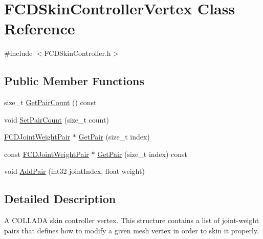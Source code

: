 \hypertarget{classFCDSkinControllerVertex}{
\section{FCDSkinControllerVertex Class Reference}
\label{classFCDSkinControllerVertex}
}


{\ttfamily \#include $<$FCDSkinController.h$>$}

\subsection*{Public Member Functions}
\begin{DoxyCompactItemize}
\item 
size\_\-t \hyperlink{classFCDSkinControllerVertex_a698817cdf93a642d47b4f9428516a025}{GetPairCount} () const 
\item 
void \hyperlink{classFCDSkinControllerVertex_a3dcfd3c7cd7f0694295d87d0c8478c9c}{SetPairCount} (size\_\-t count)
\item 
\hyperlink{structFCDJointWeightPair}{FCDJointWeightPair} $\ast$ \hyperlink{classFCDSkinControllerVertex_a344bac52a2519a2ab482836994c412d5}{GetPair} (size\_\-t index)
\item 
const \hyperlink{structFCDJointWeightPair}{FCDJointWeightPair} $\ast$ \hyperlink{classFCDSkinControllerVertex_a55fd0bfcc9015a5c81249ba18b574834}{GetPair} (size\_\-t index) const 
\item 
void \hyperlink{classFCDSkinControllerVertex_a57770871bd7a86c7959144463228b927}{AddPair} (int32 jointIndex, float weight)
\end{DoxyCompactItemize}


\subsection{Detailed Description}
A COLLADA skin controller vertex. This structure contains a list of joint-\/weight pairs that defines how to modify a given mesh vertex in order to skin it properly. 

